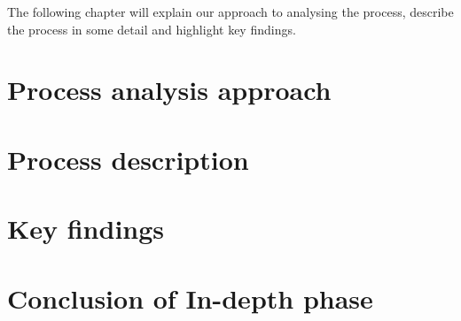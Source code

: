 The following chapter will explain our approach to analysing the process, describe the process in some detail and highlight key findings.

\section{Process analysis approach}

\section{Process description}

\section{Key findings}

\section{Conclusion of In-depth phase}
